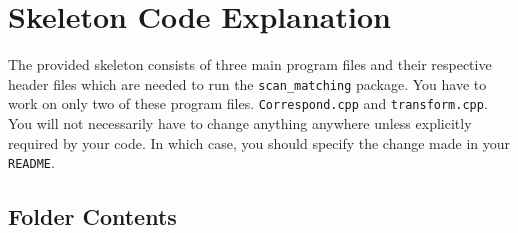 \documentclass[letta4 paper]{article}
\numberwithin{equation}{section}
\newcommand{\0}{\mathbf{0}}
\begin{document}
	\section{Skeleton Code Explanation}
	 The provided skeleton consists of three main program files and their respective header files which are needed to run the \texttt{scan\_matching} package. You have to work on only two of these program files. \texttt{Correspond.cpp} and \texttt{transform.cpp}. You will not necessarily have to change anything anywhere unless explicitly required by your code. In which case, you should specify the change made in your \texttt{README}.
	 
	 \subsection{Folder Contents}
\end{document}
